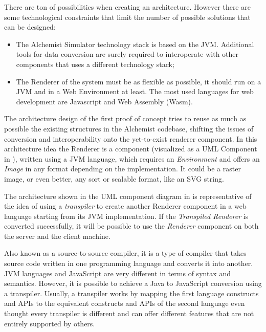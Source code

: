 There are ton of possibilities when creating an architecture. However there are some technological constraints that limit the number of possible solutions that can be designed:
\begin{itemize}
	\item The Alchemist Simulator technology stack is based on the JVM. Additional tools for data conversion are surely required to interoperate with other components that uses a different technology stack;
	\item The Renderer of the system must be as flexible as possible, it should run on a JVM and in a Web Environment at least. The most used languages for web development are Javascript and Web Assembly (Wasm).
\end{itemize}

The architecture design of the first proof of concept tries to reuse as much as possible the existing structures in the Alchemist codebase, shifting the issues of conversion and interoperability  onto the yet-to-exist renderer component. In this architecture idea the Renderer is a component (visualized as a UML Component in ), written using a JVM language, which requires an \textit{Environment} and offers an \textit{Image} in any format depending on the implementation. It could be a raster image, or even better, any sort or scalable format, like an SVG string.


The architecture shown in the UML component diagram in  is representative of the idea of using a \textit{transpiler} to create another Renderer component in a web language starting from its JVM implementation. If the \textit{Transpiled Renderer} is converted successfully, it will be possible to use the \textit{Renderer} component on both the server and the client machine.

\begin{info}[Transpiler:]
	Also known as a source-to-source compiler, it is a type of compiler that takes source code written in one programming language and converts it into another. JVM languages and JavaScript are very different in terms of syntax and semantics. However, it is possible to achieve a Java to JavaScript conversion using a transpiler.
	Usually, a transpiler works by mapping the first language constructs and APIs to the equivalent constructs and APIs of the second language even thought every transpiler is different and can offer different features that are not entirely supported by others.
\end{info}

